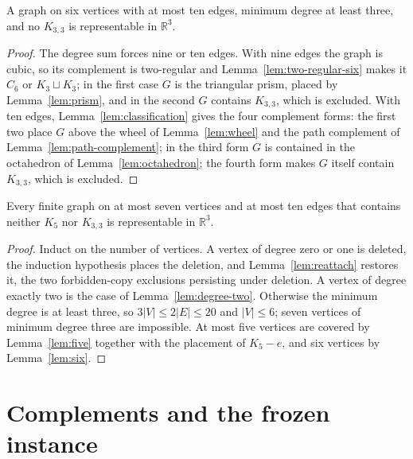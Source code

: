 \begin{lemma}
  \label{lem:six}
  \leanok
  A graph on six vertices with at most ten edges, minimum degree at least three, and no
  $K_{3,3}$ is representable in $\mathbb{R}^3$.
\end{lemma}
\begin{proof}
  The degree sum forces nine or ten edges. With nine edges the graph is cubic, so its
  complement is two-regular and Lemma~\ref{lem:two-regular-six} makes it $C_6$ or
  $K_3 \sqcup K_3$; in the first case $G$ is the triangular prism, placed by
  Lemma~\ref{lem:prism}, and in the second $G$ contains $K_{3,3}$, which is excluded.
  With ten edges, Lemma~\ref{lem:classification} gives the four complement forms: the first
  two place $G$ above the wheel of Lemma~\ref{lem:wheel} and the path complement of
  Lemma~\ref{lem:path-complement}; in the third form $G$ is contained in the octahedron of
  Lemma~\ref{lem:octahedron}; the fourth form makes $G$ itself contain $K_{3,3}$, which is
  excluded.
\end{proof}

\begin{theorem}
  \label{thm:ten}
  \leanok
  Every finite graph on at most seven vertices and at most ten edges that contains neither
  $K_5$ nor $K_{3,3}$ is representable in $\mathbb{R}^3$.
\end{theorem}
\begin{proof}
  Induct on the number of vertices. A vertex of degree zero or one is deleted, the induction
  hypothesis places the deletion, and Lemma~\ref{lem:reattach} restores it, the two
  forbidden-copy exclusions persisting under deletion. A vertex of degree exactly two is the
  case of Lemma~\ref{lem:degree-two}. Otherwise the minimum degree is at least three, so
  $3|V| \le 2|E| \le 20$ and $|V| \le 6$; seven vertices of minimum degree three are
  impossible. At most five vertices are covered by Lemma~\ref{lem:five} together with the
  placement of $K_5 - e$, and six vertices by Lemma~\ref{lem:six}.
\end{proof}

\section{Complements and the frozen instance}

